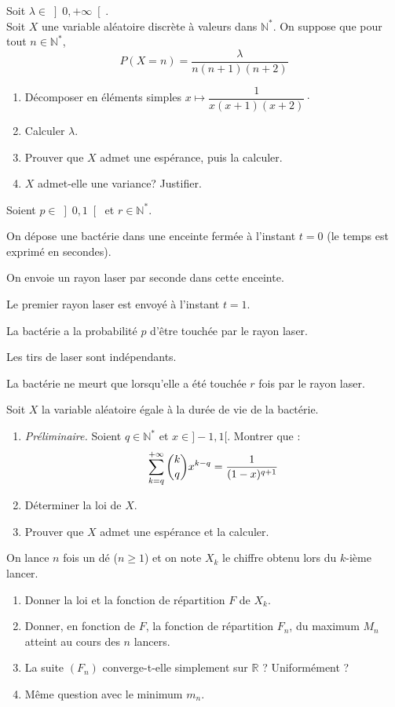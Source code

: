 \documentclass[a4paper,twoside,french,11pt]{VcCours}
\begin{document}
\begin{Exercice}{}Soit $\lambda \in{\left] 0,+\infty\right[ }$.\\
Soit $X$ une variable aléatoire discrète à valeurs dans $\mathbb{N}^\ast$. On suppose que pour tout $n \in \mathbb{N}^*$, 
$$P(X=n)=\dfrac{\lambda}{n(n+1)(n+2)} $$
\begin{enumerate}
\item Décomposer en éléments simples $x \mapsto \dfrac{1}{x(x+1)(x+2)} \cdot$
\item
Calculer $\lambda$.
\item
Prouver que $X$ admet une espérance, puis la calculer.
\item
$X$ admet-elle une variance? Justifier.
\end{enumerate}
\end{Exercice}



\begin{Exercice}{} Soient $p\in \left] 0,1\right[$ et $r\in\mathbb{N}^*$.

On dépose une bactérie dans une enceinte fermée à l'instant $t=0$ (le temps est exprimé en secondes).

On envoie un rayon laser par seconde dans cette enceinte.

Le premier rayon laser est envoyé à l'instant $t=1$.

La bactérie a la probabilité $p$ d'être touchée par le rayon laser.

Les tirs de laser sont indépendants.

La bactérie ne meurt que lorsqu'elle a été touchée $r$ fois par le rayon laser.

Soit $X$ la variable aléatoire égale à la durée de vie de la bactérie.
\begin{enumerate}
\item \textit{Préliminaire.} Soient $q \in \mathbb{N}^*$ et $x \in ]-1,1[$. Montrer que : 
$$ \sum\limits_{k=q}^{+\infty}\dbinom{k}{q}x^{k-q}=\dfrac{1}{(1-x)^{q+1}}$$
\item
Déterminer la loi de $X$.
\item
Prouver que $X$ admet une espérance et la calculer.
\end{enumerate}
\end{Exercice}




\begin{Exercice}{} On lance $n$ fois un dé ($n \geq 1$) et on note $X_k$ le chiffre obtenu lors du $k$-ième lancer.
\begin{enumerate}
\item Donner la loi et la fonction de répartition $F$ de $X_k$.
\item Donner, en fonction de $F$, la fonction de répartition $F_n$, du maximum $M_n$ atteint au cours des $n$ lancers.
\item La suite $(F_n)$ converge-t-elle simplement sur $\mathbb{R}$ ? Uniformément ?
\item Même question avec le minimum $m_n$.
\end{enumerate}
\end{Exercice}
\end{document}
